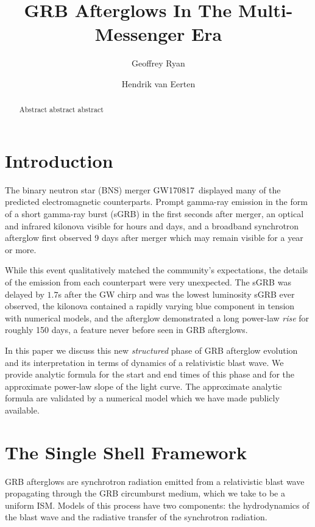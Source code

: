 \documentclass[modern]{aastex62}
\newcommand{\gwbns}{GW170817}
\begin{document}
\title{GRB Afterglows In The Multi-Messenger Era}

\author[0000-0001-9068-7157]{Geoffrey Ryan}

\author{Hendrik van Eerten}


\begin{abstract}
	Abstract abstract abstract
\end{abstract}

\section{Introduction} \label{sec:intro}
	The binary neutron star (BNS) merger \gwbns\ displayed many of the predicted electromagnetic counterparts.  Prompt gamma-ray emission in the form of a short gamma-ray burst (sGRB) in the first seconds after merger, an optical and infrared kilonova visible for hours and days, and a broadband synchrotron afterglow first observed 9 days after merger which may remain visible for a year or more.  
	
	While this event qualitatively matched the community's expectations, the details of the emission from each counterpart were very unexpected.  The sGRB was delayed by $1.7$s after the GW chirp and was the lowest luminosity sGRB ever observed, the kilonova contained a rapidly varying blue component in tension with numerical models, and the afterglow demonstrated a long power-law \emph{rise} for roughly 150 days, a feature never before seen in GRB afterglows.
	
	In this paper we discuss this new \emph{structured} phase of GRB afterglow evolution and its interpretation in terms of dynamics of a relativistic blast wave.  We provide analytic formula for the start and end times of this phase and for the approximate power-law slope of the light curve.  The approximate analytic formula are validated by a numerical model which we have made publicly available.
	
\section{The Single Shell Framework}

	GRB afterglows are synchrotron radiation emitted from a relativistic blast wave propagating through the GRB circumburst medium, which we take to be a uniform ISM.  Models of this process have two components: the hydrodynamics of the blast wave and the radiative transfer of the synchrotron radiation.  
	
\end{document}
